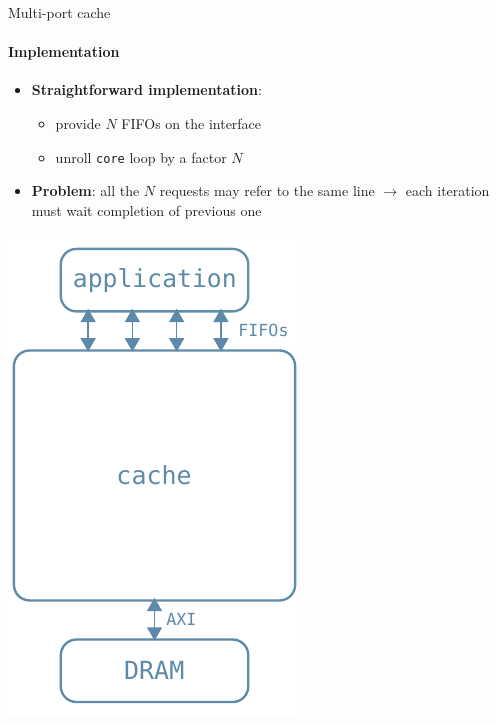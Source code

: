 \documentclass{beamer}
\begin{document}
\begin{frame}{Multi-port cache}
	\framesubtitle{Implementation}
	\begin{minipage}{.7\textwidth}
		\begin{itemize}[<+->]
			\item \textbf{Straightforward implementation}:
				\begin{itemize}[<.->]
					\item provide $N$ FIFOs on the interface
					\item unroll \texttt{core} loop by a factor $N$
				\end{itemize}
			\item \textbf{Problem}: all the $N$ requests may refer to the same line
				$\rightarrow$ each iteration must wait completion of
				previous one
		\end{itemize}
	\end{minipage}
	\begin{minipage}{.28\textwidth}
		\begin{center}
			\includegraphics[width=.9\textwidth,height=.9\textheight,keepaspectratio]{multiport_arch.pdf}
		\end{center}
	\end{minipage}
\end{frame}
\end{document}
